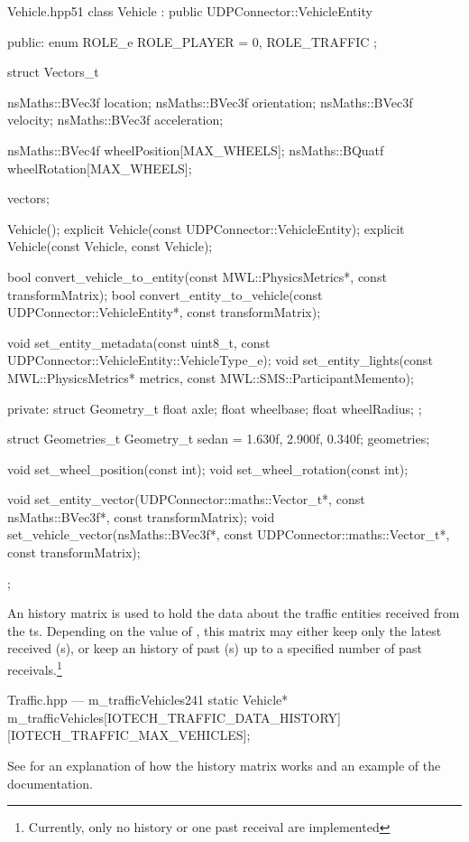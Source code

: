 \begin{codelist}{Vehicle.hpp}{51}
class Vehicle : public UDPConnector::VehicleEntity {
public:
	enum ROLE_e {
		ROLE_PLAYER = 0,
		ROLE_TRAFFIC
	};

	struct Vectors_t {
		nsMaths::BVec3f location;
		nsMaths::BVec3f orientation;
		nsMaths::BVec3f velocity;
		nsMaths::BVec3f acceleration;

		nsMaths::BVec4f wheelPosition[MAX_WHEELS];
		nsMaths::BQuatf wheelRotation[MAX_WHEELS];
	} vectors;

	Vehicle();
	explicit Vehicle(const UDPConnector::VehicleEntity);
	explicit Vehicle(const Vehicle, const Vehicle);

	bool convert_vehicle_to_entity(const MWL::PhysicsMetrics*, const transformMatrix);
	bool convert_entity_to_vehicle(const UDPConnector::VehicleEntity*, const transformMatrix);

	void set_entity_metadata(const uint8_t, const UDPConnector::VehicleEntity::VehicleType_e);
	void set_entity_lights(const MWL::PhysicsMetrics* metrics, const MWL::SMS::ParticipantMemento);

private:
	struct Geometry_t {
		float axle;
		float wheelbase;
		float wheelRadius;
	};

	struct Geometries_t {
		Geometry_t sedan = {1.630f, 2.900f, 0.340f};
	} geometries;

	void set_wheel_position(const int);
	void set_wheel_rotation(const int);

	void set_entity_vector(UDPConnector::maths::Vector_t*, const nsMaths::BVec3f*, const transformMatrix);
	void set_vehicle_vector(nsMaths::BVec3f*, const UDPConnector::maths::Vector_t*, const transformMatrix);
};
\end{codelist}

An history matrix is used to hold the data about the traffic entities received from the \gls{ts}. Depending on the value of , this matrix may either keep only the latest received (s), or keep an history of past (s) up to a specified number of past receivals.\footnote{Currently, only no history or one past receival are implemented}

\begin{codelist}{Traffic.hpp --- m\_trafficVehicles}{241}
	static Vehicle* m_trafficVehicles[IOTECH_TRAFFIC_DATA_HISTORY][IOTECH_TRAFFIC_MAX_VEHICLES];
\end{codelist}

See  for an explanation of how the history matrix works and an example of the documentation.

